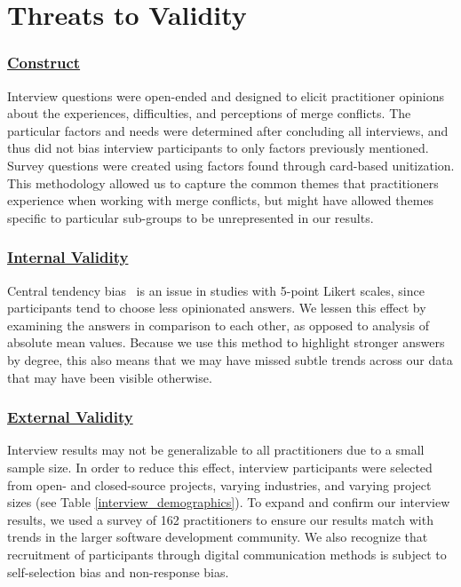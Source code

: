 \section{Threats to Validity}\label{threats}
\subsubsection{\underline{Construct}}
Interview questions were open-ended and designed to elicit practitioner opinions about the experiences, difficulties, and perceptions of merge conflicts.
The particular factors and needs were determined after concluding all interviews, and thus did not bias interview participants to only factors previously mentioned.
Survey questions were created using factors found through card-based unitization.
This methodology allowed us to capture the common themes that practitioners experience when working with merge conflicts, but might have allowed themes specific to particular sub-groups to be unrepresented in our results.
\subsubsection{\underline{Internal Validity}}
Central tendency bias~\cite{guilford1954psychometric} is an issue in studies with 5-point Likert scales, since participants tend to choose less opinionated answers.
We lessen this effect by examining the answers in comparison to each other, as opposed to analysis of absolute mean values.
Because we use this method to highlight stronger answers by degree, this also means that we may have missed subtle trends across our data that may have been visible otherwise.

\subsubsection{\underline{External Validity}}
Interview results may not be generalizable to all practitioners due to a small sample size.
In order to reduce this effect, interview participants were selected from open- and closed-source projects, varying industries, and varying project sizes (see Table \ref{interview_demographics}).
To expand and confirm our interview results, we used a survey of 162 practitioners to ensure our results match with trends in the larger software development community.
We also recognize that recruitment of participants through digital communication methods is subject to self-selection bias and non-response bias.

